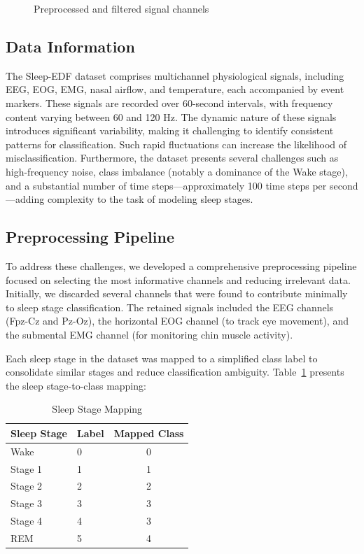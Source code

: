 \begin{figure}[H]
\begin{minipage}{0.48\textwidth}
		\caption{Preprocessed and filtered signal channels}
		\label{fig:filtered_signals}
	\end{minipage}
\end{figure}


\subsection{Data Information}

The Sleep-EDF dataset comprises multichannel physiological signals, including EEG, EOG, EMG, nasal airflow, and temperature, each accompanied by event markers. These signals are recorded over 60-second intervals, with frequency content varying between 60 and 120 Hz. The dynamic nature of these signals introduces significant variability, making it challenging to identify consistent patterns for classification. Such rapid fluctuations can increase the likelihood of misclassification. Furthermore, the dataset presents several challenges such as high-frequency noise, class imbalance (notably a dominance of the Wake stage), and a substantial number of time steps—approximately 100 time steps per second—adding complexity to the task of modeling sleep stages.

\subsection{Preprocessing Pipeline}

To address these challenges, we developed a comprehensive preprocessing pipeline focused on selecting the most informative channels and reducing irrelevant data. Initially, we discarded several channels that were found to contribute minimally to sleep stage classification. The retained signals included the EEG channels (Fpz-Cz and Pz-Oz), the horizontal EOG channel (to track eye movement), and the submental EMG channel (for monitoring chin muscle activity).

Each sleep stage in the dataset was mapped to a simplified class label to consolidate similar stages and reduce classification ambiguity. Table~\ref{tab:sleep_stage_mapping} presents the sleep stage-to-class mapping:

\begin{table}[H]
	\centering
	\caption{Sleep Stage Mapping}
	\label{tab:sleep_stage_mapping}
	\begin{tabular}{llc}
		\hline
		\textbf{Sleep Stage} & \textbf{Label} & \textbf{Mapped Class} \\
		\hline
		Wake                & 0 & 0 \\
		Stage 1             & 1 & 1 \\
		Stage 2             & 2 & 2 \\
		Stage 3             & 3 & 3 \\
		Stage 4             & 4 & 3 \\
		REM                 & 5 & 4 \\
		\hline
	\end{tabular}
\end{table}

